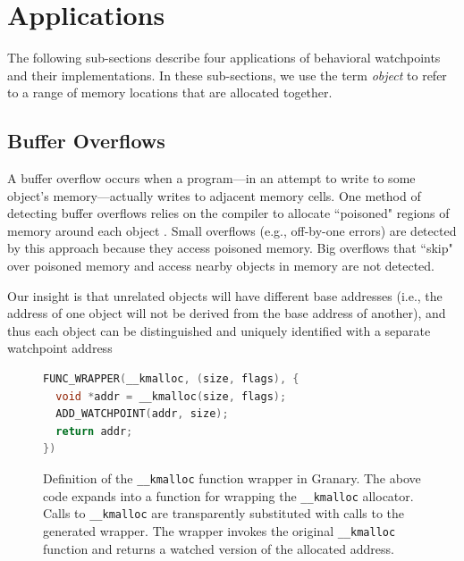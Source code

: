 \documentclass[letterpaper,twocolumn,10pt]{article}
\begin{document}
\section{Applications\label{sec:applications}}
The following sub-sections describe four applications of behavioral watchpoints and their implementations. In these sub-sections, we use the term \emph{object} to refer to a range of memory locations that are allocated together.%


\subsection{Buffer Overflows \label{sec:buffer_overflows}}
A buffer overflow occurs when a program---in an attempt to write to some object's memory---actually writes to adjacent memory cells. One method of detecting buffer overflows relies on the compiler to allocate ``poisoned" regions of memory around each object \cite{AddressSanitizer}. Small overflows (e.g., off-by-one errors) are detected by this approach because they access poisoned memory. Big overflows that ``skip" over poisoned memory and access nearby objects in memory are not detected.

Our insight is that unrelated objects will have different base addresses (i.e., the address of one object will not be derived from the base %
address of another), and thus each object can be distinguished and uniquely identified with a separate watchpoint address%

\begin{figure}
\begin{lstlisting}[language=C,basicstyle=\footnotesize\ttfamily]
FUNC_WRAPPER(__kmalloc, (size, flags), {
  void *addr = __kmalloc(size, flags);
  ADD_WATCHPOINT(addr, size);
  return addr;
})
\end{lstlisting}
\vspace{-10pt}
\caption{\label{fig:kmalloc_wrapper}Definition of the \texttt{\_\_kmalloc} function wrapper in Granary. The above code expands into a function for wrapping the \texttt{\_\_kmalloc} allocator. Calls to \texttt{\_\_kmalloc} are transparently substituted with calls to the generated wrapper. The wrapper invokes the original \texttt{\_\_kmalloc} function and returns a watched version of the allocated address.}
\end{figure}
\end{document}
